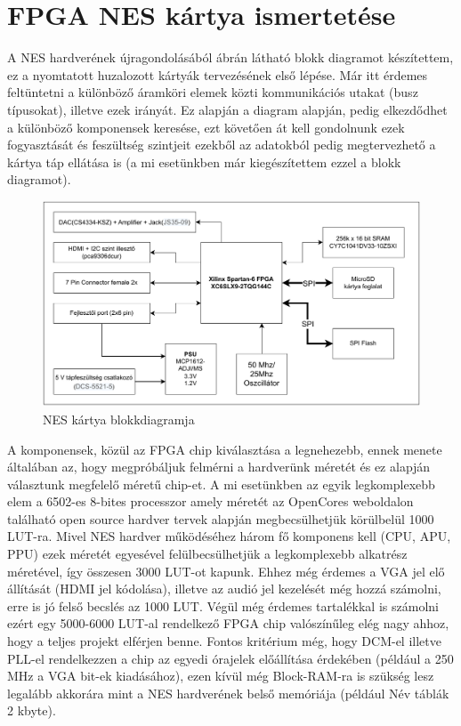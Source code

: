 \chapter{FPGA NES kártya ismertetése}

A NES hardverének újragondolásából  ábrán látható blokk diagramot készítettem, ez a nyomtatott huzalozott kártyák tervezésének első lépése. Már itt érdemes feltüntetni a különböző áramköri elemek közti kommunikációs utakat (busz típusokat), illetve ezek irányát. Ez alapján a diagram alapján, pedig elkezdődhet a különböző komponensek keresése, ezt követően át kell gondolnunk ezek fogyasztását és feszültség szintjeit ezekből az adatokból pedig megtervezhető a kártya táp ellátása is (a mi esetünkben már kiegészítettem ezzel a blokk diagramot). 

\begin{figure}[H]
	\centering
	\includegraphics[width=150mm, keepaspectratio]{figures/NES-board-blockdiagram}
	\caption{NES kártya blokkdiagramja}
	\label{fig:PCB-blockdiagram}
\end{figure}

A komponensek, közül az FPGA chip kiválasztása a legnehezebb, ennek menete általában az, hogy megpróbáljuk felmérni a hardverünk méretét és ez alapján választunk megfelelő méretű chip-et. A mi esetünkben az egyik legkomplexebb elem a 6502-es 8-bites processzor amely méretét az OpenCores weboldalon található open source hardver tervek alapján megbecsülhetjük körülbelül 1000 LUT-ra. Mivel NES hardver működéséhez három fő komponens kell (CPU, APU, PPU) ezek méretét egyesével felülbecsülhetjük a legkomplexebb alkatrész méretével, így összesen 3000 LUT-ot kapunk. Ehhez még érdemes a VGA jel elő állítását (HDMI jel kódolása), illetve az audió jel kezelését még hozzá számolni, erre is jó felső becslés az 1000 LUT. Végül még érdemes tartalékkal is számolni ezért egy 5000-6000 LUT-al rendelkező FPGA chip valószínűleg elég nagy ahhoz, hogy a teljes projekt elférjen benne. Fontos kritérium még, hogy DCM-el illetve PLL-el rendelkezzen a chip az egyedi órajelek előállítása érdekében (például a 250 MHz a VGA bit-ek kiadásához), ezen kívül még Block-RAM-ra is szükség lesz legalább akkorára mint a NES hardverének belső memóriája (például Név táblák 2 kbyte).  

